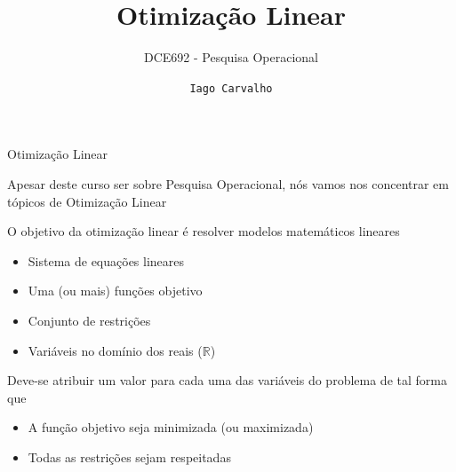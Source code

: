\documentclass[compress]{beamer}
\title{Otimização Linear}
\subtitle{DCE692 - Pesquisa Operacional}
\author{\texttt{Iago Carvalho}}
\institute{\texttt{Departamento de Ciência da Computação}}
\begin{document}
\begin{frame}
\titlepage

\end{frame}


\begin{frame}{Otimização Linear}

Apesar deste curso ser sobre Pesquisa Operacional, nós vamos nos concentrar em tópicos de Otimização Linear

\vspace{0.5cm}

O objetivo da otimização linear é resolver modelos matemáticos lineares
\begin{itemize}
    \item Sistema de equações lineares
    \item Uma (ou mais) funções objetivo
    \item Conjunto de restrições
    \item Variáveis no domínio dos reais ($\mathbb{R}$)
\end{itemize}

\vspace{0.5cm}

Deve-se atribuir um valor para cada uma das variáveis do problema de tal forma que
\begin{itemize}
    \item A função objetivo seja minimizada (ou maximizada)
    \item Todas as restrições sejam respeitadas
\end{itemize}
\end{frame}

\end{document}
